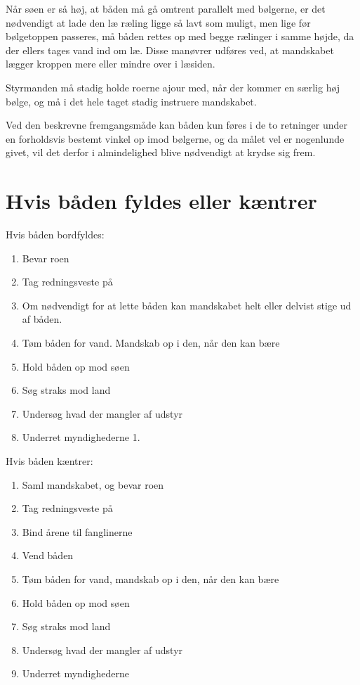 \documentclass{article}
\begin{document}
Når søen er så høj, at båden må gå omtrent parallelt med bølgerne, er det
nødvendigt at lade den læ ræling ligge så lavt som muligt, men lige før
bølgetoppen passeres, må båden rettes op med begge rælinger i samme
højde, da der ellers tages vand ind om læ. Disse manøvrer udføres ved, at
mandskabet lægger kroppen mere eller mindre over i læsiden.

Styrmanden må stadig holde roerne ajour med, når der kommer en særlig høj
bølge, og må i det hele taget stadig instruere mandskabet.

Ved den beskrevne fremgangsmåde kan båden kun føres i de to retninger
under en forholdsvis bestemt vinkel op imod bølgerne, og da målet vel er
nogenlunde givet, vil det derfor i almindelighed blive nødvendigt at
krydse sig frem.

\section{Hvis båden fyldes eller kæntrer}

Hvis båden bordfyldes:

\begin{enumerate}
    \item Bevar roen
    \item Tag redningsveste på
    \item Om nødvendigt for at lette båden kan mandskabet helt eller
        delvist stige ud af båden.
    \item Tøm båden for vand. Mandskab op i den, når den kan bære
    \item Hold båden op mod søen
    \item Søg straks mod land
    \item Undersøg hvad der mangler af udstyr
    \item Underret myndighederne 1.
\end{enumerate}

Hvis båden kæntrer:

\begin{enumerate}
    \item Saml mandskabet, og bevar roen
    \item Tag redningsveste på
    \item Bind årene til fanglinerne
    \item Vend båden
    \item Tøm båden for vand, mandskab op i den, når den kan bære
    \item Hold båden op mod søen
    \item Søg straks mod land
    \item Undersøg hvad der mangler af udstyr
    \item Underret myndighederne
\end{enumerate}
\end{document}
